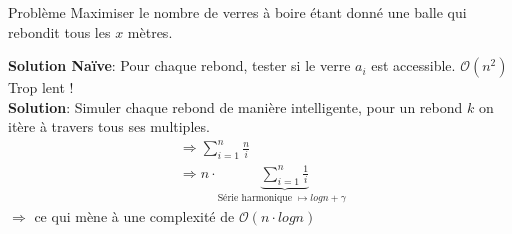 \begin{frame}
    \frametitle{\problemtitle}
        \begin{block}
            {Problème} Maximiser le nombre de verres à boire étant donné une balle qui rebondit tous les $x$ mètres.
        \end{block}
        \pause
        \textbf{Solution Naïve}: Pour chaque rebond, tester si le verre $a_i$ est accessible. $\mathcal O(n^2)$ Trop lent !\\
        \pause
        \textbf{Solution}: Simuler chaque rebond de manière intelligente, pour un rebond $k$ on itère à travers tous ses multiples. \\
        \pause
        \begin{align}
            &\Rightarrow \sum_{i=1}^{n} \frac{n}{i}\\
            &\Rightarrow n \cdot \underbrace{\sum_{i=1}^{n} \frac{1}{i}}_{\text{Série harmonique $\mapsto log n + \gamma$ }}
        \end{align}
        $\Rightarrow$ ce qui mène à une complexité de $\mathcal O(n \cdot log n)$

\end{frame}
